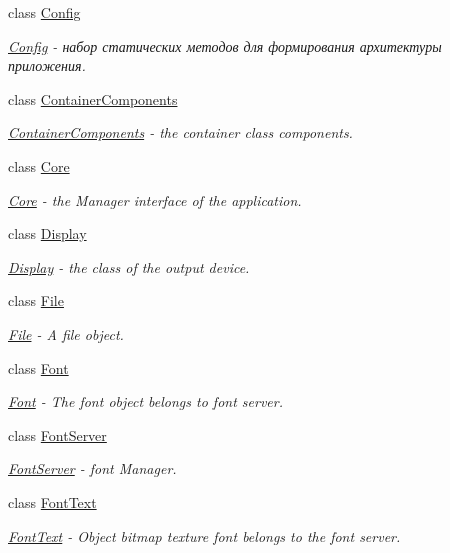 \begin{DoxyCompactItemize}
class \hyperlink{classcsad_1_1_config}{Config}
\begin{DoxyCompactList}\small\item\em \hyperlink{classcsad_1_1_config}{Config} -\/ набор статических методов для формирования архитектуры приложения. \end{DoxyCompactList}\item 
class \hyperlink{classcsad_1_1_container_components}{Container\-Components}
\begin{DoxyCompactList}\small\item\em \hyperlink{classcsad_1_1_container_components}{Container\-Components} -\/ the container class components. \end{DoxyCompactList}\item 
class \hyperlink{classcsad_1_1_core}{Core}
\begin{DoxyCompactList}\small\item\em \hyperlink{classcsad_1_1_core}{Core} -\/ the Manager interface of the application. \end{DoxyCompactList}\item 
class \hyperlink{classcsad_1_1_display}{Display}
\begin{DoxyCompactList}\small\item\em \hyperlink{classcsad_1_1_display}{Display} -\/ the class of the output device. \end{DoxyCompactList}\item 
class \hyperlink{classcsad_1_1_file}{File}
\begin{DoxyCompactList}\small\item\em \hyperlink{classcsad_1_1_file}{File} -\/ A file object. \end{DoxyCompactList}\item 
class \hyperlink{classcsad_1_1_font}{Font}
\begin{DoxyCompactList}\small\item\em \hyperlink{classcsad_1_1_font}{Font} -\/ The font object belongs to font server. \end{DoxyCompactList}\item 
class \hyperlink{classcsad_1_1_font_server}{Font\-Server}
\begin{DoxyCompactList}\small\item\em \hyperlink{classcsad_1_1_font_server}{Font\-Server} -\/ font Manager. \end{DoxyCompactList}\item 
class \hyperlink{classcsad_1_1_font_text}{Font\-Text}
\begin{DoxyCompactList}\small\item\em \hyperlink{classcsad_1_1_font_text}{Font\-Text} -\/ Object bitmap texture font belongs to the font server. \end{DoxyCompactList}\item 

\end{DoxyCompactItemize}
